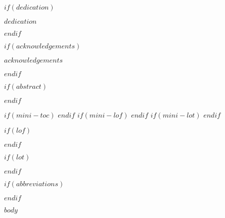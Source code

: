 \documentclass[en-GB, a4paper, $if(page-layout)$$page-layout$$endif$]{templates/bathreport}
\newcommand*{\bibtitle}{$bibliography-heading-in-pdf$}
\newcommand*{\bibtitle}{$bibliography-heading-in-pdf$}
\begin{document}
\begin{romanpages}

\maketitle %

$if(dedication)$
\begin{dedication}
  $dedication$
\end{dedication}
$endif$

$if(acknowledgements)$
\begin{acknowledgements}
 	$acknowledgements$
\end{acknowledgements}
$endif$

$if(abstract)$
\begin{abstract}
	$abstract$
\end{abstract}
$endif$

$if(mini-toc)$
  \dominitoc %
$endif$
$if(mini-lof)$
  \dominilof  %
$endif$
$if(mini-lot)$
  \dominilot  %
$endif$

\flushbottom

\tableofcontents

$if(lof)$
\listoffigures
	\mtcaddchapter
$endif$

$if(lot)$
\listoftables
  \mtcaddchapter
$endif$

$if(abbreviations)$

$endif$

\end{romanpages}

\flushbottom
$body$


\setlength{\baselineskip}{0pt} %

{\renewcommand*\MakeUppercase[1]{#1}%
\printbibliography[heading=bibintoc,title={\bibtitle}]}
\end{document}
